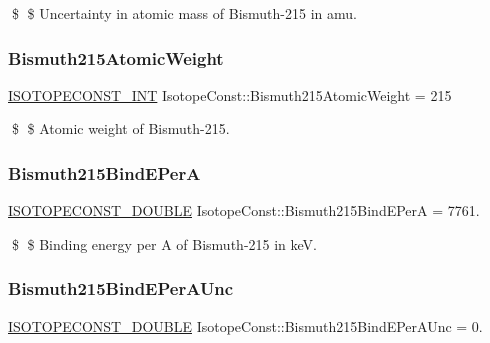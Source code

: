 \$ \$ Uncertainty in atomic mass of Bismuth-\/215 in amu. \mbox{\label{group___isotope_const-_bismuth-_bi215_ga792d518ad82b0edc4c40fb9ac8c7b872}} 
\subsubsection{\texorpdfstring{Bismuth215\+Atomic\+Weight}{Bismuth215AtomicWeight}}
{\footnotesize\ttfamily \mbox{\hyperlink{group___isotope_const-_macros_ga5f18360b3e99483a35c32d789e62621c}{I\+S\+O\+T\+O\+P\+E\+C\+O\+N\+S\+T\+\_\+\+I\+NT}} Isotope\+Const\+::\+Bismuth215\+Atomic\+Weight = 215}

\$ \$ Atomic weight of Bismuth-\/215. \mbox{\label{group___isotope_const-_bismuth-_bi215_ga4fa12524a13726767338cdfe3167fac2}} 
\subsubsection{\texorpdfstring{Bismuth215\+Bind\+E\+PerA}{Bismuth215BindEPerA}}
{\footnotesize\ttfamily \mbox{\hyperlink{group___isotope_const-_macros_ga8f45a7272ce02c0b4c65c44636ed719a}{I\+S\+O\+T\+O\+P\+E\+C\+O\+N\+S\+T\+\_\+\+D\+O\+U\+B\+LE}} Isotope\+Const\+::\+Bismuth215\+Bind\+E\+PerA = 7761.}

\$ \$ Binding energy per A of Bismuth-\/215 in keV. \mbox{\label{group___isotope_const-_bismuth-_bi215_ga1ff6db3bf269e9fc87877a8fef8964b2}} 
\subsubsection{\texorpdfstring{Bismuth215\+Bind\+E\+Per\+A\+Unc}{Bismuth215BindEPerAUnc}}
{\footnotesize\ttfamily \mbox{\hyperlink{group___isotope_const-_macros_ga8f45a7272ce02c0b4c65c44636ed719a}{I\+S\+O\+T\+O\+P\+E\+C\+O\+N\+S\+T\+\_\+\+D\+O\+U\+B\+LE}} Isotope\+Const\+::\+Bismuth215\+Bind\+E\+Per\+A\+Unc = 0.}

